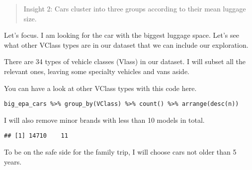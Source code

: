 \documentclass[]{article}
\newenvironment{Shaded}{\begin{snugshade}}{\end{snugshade}}
\newcommand{\DataTypeTok}[1]{\textcolor[rgb]{0.13,0.29,0.53}{#1}}
\newcommand{\DecValTok}[1]{\textcolor[rgb]{0.00,0.00,0.81}{#1}}
\newcommand{\KeywordTok}[1]{\textcolor[rgb]{0.13,0.29,0.53}{\textbf{#1}}}
\newcommand{\NormalTok}[1]{#1}
\newcommand{\OperatorTok}[1]{\textcolor[rgb]{0.81,0.36,0.00}{\textbf{#1}}}
\newcommand{\StringTok}[1]{\textcolor[rgb]{0.31,0.60,0.02}{#1}}
\begin{document}
\begin{quote}
Insight 2: Cars cluster into three groups according to their mean
luggage size.
\end{quote}

Let's focus. I am looking for the car with the biggest luggage space.
Let's see what other VClass types are in our dataset that we can include
our exploration.

There are 34 types of vehicle classes (Vlass) in our dataset. I will
subset all the relevant ones, leaving some specialty vehicles and vans
aside.

You can have a look at other VClass types with this code here.

\texttt{big\_epa\_cars\ \%\textgreater{}\%\ group\_by(VClass)\ \%\textgreater{}\%\ count()\ \%\textgreater{}\%\ arrange(desc(n))}

I will also remove minor brands with less than 10 models in total.

\begin{Shaded}
\end{Shaded}

\begin{verbatim}
## [1] 14710    11
\end{verbatim}

To be on the safe side for the family trip, I will choose cars not older
than 5 years.
\end{document}
